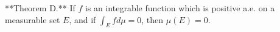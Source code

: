 **Theorem D.** If $f$ is an integrable function which is positive a.e. on a measurable set $E$, and if $\int_E f d\mu = 0$, then $\mu(E) = 0$.
